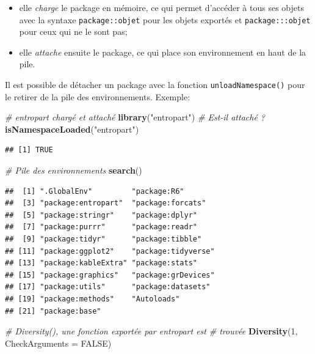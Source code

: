 \documentclass[
  12pt,
  french,
  a4paper,
  extrafontsizes,onecolumn,openright
  ]{memoir}
\newenvironment{Shaded}{\begin{snugshade}}{\end{snugshade}}
\newcommand{\CommentTok}[1]{\textcolor[rgb]{0.56,0.35,0.01}{\textit{#1}}}
\newcommand{\DataTypeTok}[1]{\textcolor[rgb]{0.13,0.29,0.53}{#1}}
\newcommand{\DecValTok}[1]{\textcolor[rgb]{0.00,0.00,0.81}{#1}}
\newcommand{\KeywordTok}[1]{\textcolor[rgb]{0.13,0.29,0.53}{\textbf{#1}}}
\newcommand{\NormalTok}[1]{#1}
\newcommand{\OtherTok}[1]{\textcolor[rgb]{0.56,0.35,0.01}{#1}}
\newcommand{\StringTok}[1]{\textcolor[rgb]{0.31,0.60,0.02}{#1}}
\providecommand{\tightlist}{%
  \setlength{\itemsep}{0pt}\setlength{\parskip}{0pt}}
\begin{document}
\begin{itemize}
\tightlist
\item
  elle \emph{charge} le package en mémoire, ce qui permet d'accéder à tous ses objets avec la syntaxe \texttt{package::objet} pour les objets exportés et \texttt{package:::objet} pour ceux qui ne le sont pas;
\item
  elle \emph{attache} ensuite le package, ce qui place son environnement en haut de la pile.
\end{itemize}

Il est possible de détacher un package avec la fonction \texttt{unloadNamespace()} pour le retirer de la pile des environnements.
Exemple:

\scriptsize

\begin{Shaded}
\begin{Highlighting}[]
\CommentTok{# entropart chargé et attaché}
\KeywordTok{library}\NormalTok{(}\StringTok{"entropart"}\NormalTok{)}
\CommentTok{# Est-il attaché ?}
\KeywordTok{isNamespaceLoaded}\NormalTok{(}\StringTok{"entropart"}\NormalTok{)}
\end{Highlighting}
\end{Shaded}

\begin{verbatim}
## [1] TRUE
\end{verbatim}

\begin{Shaded}
\begin{Highlighting}[]
\CommentTok{# Pile des environnements}
\KeywordTok{search}\NormalTok{()}
\end{Highlighting}
\end{Shaded}

\begin{verbatim}
##  [1] ".GlobalEnv"         "package:R6"        
##  [3] "package:entropart"  "package:forcats"   
##  [5] "package:stringr"    "package:dplyr"     
##  [7] "package:purrr"      "package:readr"     
##  [9] "package:tidyr"      "package:tibble"    
## [11] "package:ggplot2"    "package:tidyverse" 
## [13] "package:kableExtra" "package:stats"     
## [15] "package:graphics"   "package:grDevices" 
## [17] "package:utils"      "package:datasets"  
## [19] "package:methods"    "Autoloads"         
## [21] "package:base"
\end{verbatim}

\begin{Shaded}
\begin{Highlighting}[]
\CommentTok{# Diversity(), une fonction exportée par entropart est}
\CommentTok{# trouvée}
\KeywordTok{Diversity}\NormalTok{(}\DecValTok{1}\NormalTok{, }\DataTypeTok{CheckArguments =} \OtherTok{FALSE}\NormalTok{)}
\end{Highlighting}
\end{Shaded}
\end{document}
